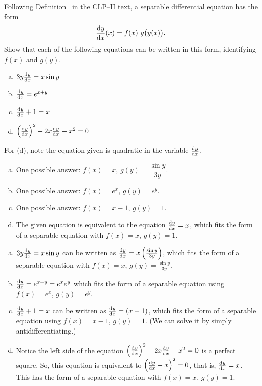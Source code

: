 \begin{Mquestion}
Following Definition~ in the CLP--II text, a separable differential equation has the form
\[\diff{y}{x}(x) = f(x)\ g\big(y(x)\big).\]
Show that each of the following equations can be written in this form, identifying $f(x)$ and $g(y)$.
\begin{enumerate}[(a)]
\item $3y\diff{y}{x}=x\sin y$
\item $\diff{y}{x} = e^{x+y}$
\item  $\diff{y}{x}+1=x$
\item $\left(\diff{y}{x}\right)^2-2x\diff{y}{x}+x^2=0$
\end{enumerate}
\end{Mquestion}
\begin{hint}
For (d), note the equation given is quadratic in the variable $\diff{y}{x}$.
\end{hint}
\begin{answer}
\begin{enumerate}[(a)]
\item One possible answer: $f(x)=x$, $g(y)=\dfrac{\sin y}{3y}$.
\item One possible answer:  $f(x) = e^x$, $g(y) = e^y$.
\item One possible answer:  $f(x) = x-1$, $g(y) = 1$.
\item The given equation is equivalent to the equation $\diff{y}{x}=x$, which fits the form of a separable equation with $f(x)=x$, $g(y)=1$.
\end{enumerate}
\end{answer}
\begin{solution}
\begin{enumerate}[(a)]
\item $3y\diff{y}{x}=x\sin y$ can be written as $\diff{y}{x} = x\left(\frac{\sin y}{3y}\right)$, which fits the form of a separable equation with $f(x)=x$, $g(y) = \frac{\sin y}{3y}$.
\item $\diff{y}{x} = e^{x+y} = e^xe^y$
which fits the form of a separable equation using $f(x) = e^x$, $g(y) = e^y$.
\item  $\diff{y}{x}+1=x$ can be written as $\diff{y}{x} = (x-1)$, which fits the form of a separable equation using $f(x)=x-1$, $g(y)=1$. (We can solve it by simply antidifferentiating.)
\item Notice the left side of the equation $\left(\diff{y}{x}\right)^2-2x\diff{y}{x}+x^2=0$ is a perfect square. So, this equation is equivalent to $\left(\diff{y}{x}-x\right)^2=0$, that is, $\diff{y}{x}=x$. This has the form of a separable equation with $f(x)=x$, $g(y)=1$.
\end{enumerate}
\end{solution}

